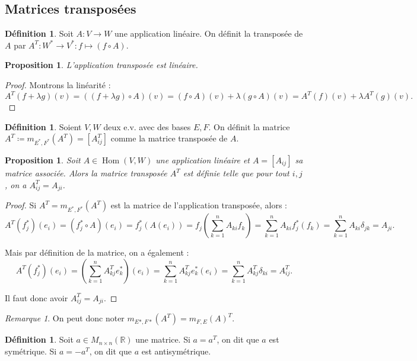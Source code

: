 \documentclass{article}
\DeclareMathOperator{\Hom}{Hom}
\newcommand{\R}{\mathbb R}
\newcommand{\M}[3]{M_{#1 \times #2}(#3)}
\newtheorem{prp}[thm]{Proposition}
\theoremstyle{definition}
\newtheorem{déf}[thm]{Définition}
\theoremstyle{remark}
\newtheorem*{rmq}{Remarque}
\begin{document}
	\subsection{Matrices transposées}
		\begin{déf} Soit $A : V \to W$ une application linéaire. On définit la transposée de $A$ par $A^T : W^* \to V^* : f \mapsto (f \circ A)$. \end{déf}

		\begin{prp} L'application transposée est linéaire. \end{prp}
		
		\begin{proof} Montrons la linéarité : \[A^T(f+\lambda g)(v) = ((f+\lambda g) \circ A)(v) = (f \circ A)(v) + \lambda (g \circ A)(v) = A^T(f)(v) + \lambda A^T(g)(v).\]
		\end{proof}

		\begin{déf} Soient $V, W$ deux e.v. avec des bases $E, F$. On définit la matrice $A^T \coloneqq m_{E^*, F^*}(A^T)  = [A^T_{ij}]$ comme la matrice transposée de $A$.
		\end{déf}

		\begin{prp} Soit $A \in \Hom(V, W)$ une application linéaire et $A = [A_{ij}]$ sa matrice associée. Alors la matrice transposée $A^T$ est définie telle que pour tout
		$i, j$, on a $A^T_{ij} = A_{ji}$. \end{prp}

		\begin{proof} Si $A^T = m_{E^*, F^*}(A^T)$ est la matrice de l'application transposée, alors : \[A^T(f_j^*)(e_i) = (f_j^* \circ A)(e_i) = f_j^*(A(e_i))
		= f_j\left(\sum_{k=1}^nA_{ki}f_k\right) = \sum_{k=1}^nA_{ki}f_j^*(f_k) = \sum_{k=1}^nA_{ki}\delta_{jk} = A_{ji}.\]

		Mais par définition de la matrice, on a également : \[A^T(f_j^*)(e_i) = \left(\sum_{k=1}^nA^T_{kj}e_k^*\right)(e_i) = \sum_{k=1}^nA^T_{kj}e_k^*(e_i)
		= \sum_{k=1}^nA^T_{kj}\delta_{ki} = A^T_{ij}.\]

		Il faut donc avoir $A^T_{ij} = A_{ji}$. \end{proof}

		\begin{rmq} On peut donc noter $m_{E*, F*}(A^T) = m_{F, E}(A)^T$. \end{rmq}

		\begin{déf} Soit $a \in \M nn\R$ une matrice. Si $a=a^T$, on dit que $a$ est symétrique. Si $a=-a^T$, on dit que $a$ est antisymétrique. \end{déf}
\end{document}
